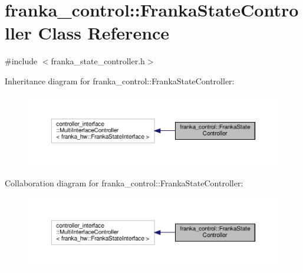\hypertarget{classfranka__control_1_1_franka_state_controller}{}\section{franka\+\_\+control\+:\+:Franka\+State\+Controller Class Reference}
\label{classfranka__control_1_1_franka_state_controller}


{\ttfamily \#include $<$franka\+\_\+state\+\_\+controller.\+h$>$}



Inheritance diagram for franka\+\_\+control\+:\+:Franka\+State\+Controller\+:
\nopagebreak
\begin{figure}[H]
\begin{center}
\leavevmode
\includegraphics[width=350pt]{classfranka__control_1_1_franka_state_controller__inherit__graph}
\end{center}
\end{figure}


Collaboration diagram for franka\+\_\+control\+:\+:Franka\+State\+Controller\+:
\nopagebreak
\begin{figure}[H]
\begin{center}
\leavevmode
\includegraphics[width=350pt]{classfranka__control_1_1_franka_state_controller__coll__graph}
\end{center}
\end{figure}
